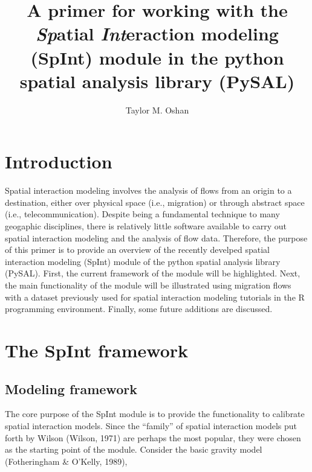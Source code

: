 \documentclass[11pt]{article}
\begin{document}
    
    \title{\texorpdfstring{A primer for working with the
\textbf{\emph{Sp}}atial \textbf{\emph{Int}}eraction modeling (SpInt)
module in the python spatial analysis library
(PySAL)}{A primer for working with the Spatial Interaction modeling (SpInt) module in the python spatial analysis library (PySAL)}}\label{a-primer-for-working-with-the-spatial-interaction-modeling-spint-module-in-the-python-spatial-analysis-library-pysal}

    \author{Taylor M. Oshan}
    
    \maketitle
    
   

    \section{Introduction}\label{introduction}

    Spatial interaction modeling involves the analysis of flows from an
origin to a destination, either over physical space (i.e., migration) or
through abstract space (i.e., telecommunication). Despite being a
fundamental technique to many geogaphic disciplines, there is relatively
little software available to carry out spatial interaction modeling and
the analysis of flow data. Therefore, the purpose of this primer is to
provide an overview of the recently develped spatial interaction
modeling (SpInt) module of the python spatial analysis library (PySAL).
First, the current framework of the module will be highlighted. Next,
the main functionality of the module will be illustrated using migration
flows with a dataset previously used for spatial interaction modeling
tutorials in the R programming environment. Finally, some future
additions are discussed.

    \section{The SpInt framework}\label{the-spint-framework}

    \subsection{Modeling framework}\label{modeling-framework}

    The core purpose of the SpInt module is to provide the functionality to
calibrate spatial interaction models. Since the ``family'' of spatial
interaction models put forth by Wilson (Wilson, 1971) are perhaps the
most popular, they were chosen as the starting point of the module.
Consider the basic gravity model (Fotheringham \& O'Kelly, 1989),
\end{document}
